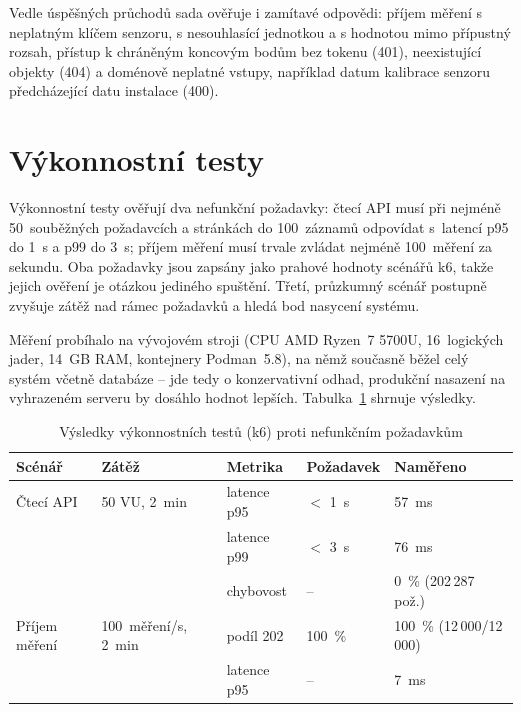 Vedle úspěšných průchodů sada ověřuje i zamítavé odpovědi: příjem měření s neplatným klíčem senzoru, s nesouhlasící jednotkou a s hodnotou mimo přípustný rozsah, přístup k chráněným koncovým bodům bez tokenu (401), neexistující objekty (404) a doménově neplatné vstupy, například datum kalibrace senzoru předcházející datu instalace (400).

\section{Výkonnostní testy}

Výkonnostní testy ověřují dva nefunkční požadavky: čtecí API musí při nejméně 50~souběžných požadavcích a stránkách do 100~záznamů odpovídat s~latencí p95 do 1~s a p99 do 3~s; příjem měření musí trvale zvládat nejméně 100~měření za sekundu. Oba požadavky jsou zapsány jako prahové hodnoty scénářů k6, takže jejich ověření je otázkou jediného spuštění. Třetí, průzkumný scénář postupně zvyšuje zátěž nad rámec požadavků a hledá bod nasycení systému.

Měření probíhalo na vývojovém stroji (CPU AMD Ryzen~7 5700U, 16~logických jader, 14~GB RAM, kontejnery Podman~5.8), na němž současně běžel celý systém včetně databáze -- jde tedy o konzervativní odhad, produkční nasazení na vyhrazeném serveru by dosáhlo hodnot lepších. Tabulka~\ref{tab:vykon} shrnuje výsledky.

\begin{table}[htbp]
  \centering
  \caption{Výsledky výkonnostních testů (k6) proti nefunkčním požadavkům}
  \label{tab:vykon}
  \begin{tabular}{lllll}
    \hline
    Scénář & Zátěž & Metrika & Požadavek & Naměřeno \\
    \hline
    Čtecí API     & 50 VU, 2~min        & latence p95     & $<$ 1~s   & 57~ms \\
                  &                     & latence p99     & $<$ 3~s   & 76~ms \\
                  &                     & chybovost       & --        & 0~\% (202\,287 pož.) \\
    Příjem měření & 100~měření/s, 2~min & podíl 202       & 100~\%    & 100~\% (12\,000/12\,000) \\
                  &                     & latence p95     & --        & 7~ms \\
    \hline
  \end{tabular}
\end{table}

